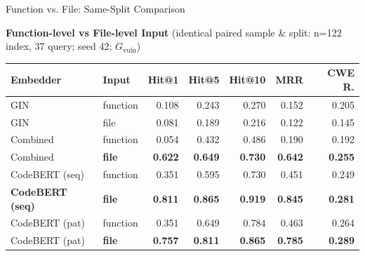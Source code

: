 \documentclass[aspectratio=169,10pt]{beamer}
\begin{document}


\begin{frame}{Function vs. File: Same-Split Comparison}

  \begin{center}
    {\small\textbf{Function-level vs File-level Input} {\scriptsize(identical paired sample \& split: n=122 index, 37 query; seed 42; $G_{\mathrm{vuln}}$)}}\\[4pt]
  {\scriptsize
  \renewcommand{\arraystretch}{1.15}
  \setlength{\tabcolsep}{4pt}
    \begin{tabular}{llrrrrr}
      \toprule
      \textbf{Embedder} & \textbf{Input} & \textbf{Hit@1} & \textbf{Hit@5} & \textbf{Hit@10} & \textbf{MRR} & \textbf{CWE R.} \\
      \midrule
      GIN & function & 0.108 & 0.243 & 0.270 & 0.152 & 0.205 \\
      \rowcolor{miss!15}
      GIN & file & 0.081 & 0.189 & 0.216 & 0.122 & 0.145 \\
      \midrule
      Combined & function & 0.054 & 0.432 & 0.486 & 0.190 & 0.192 \\
      \rowcolor{hit!12}
      Combined & \textbf{file} & \textbf{0.622} & \textbf{0.649} & \textbf{0.730} & \textbf{0.642} & \textbf{0.255} \\
      \midrule
      CodeBERT (seq) & function & 0.351 & 0.595 & 0.730 & 0.451 & 0.249 \\
      \rowcolor{hit!12}
      \textbf{CodeBERT (seq)} & \textbf{file} & \textbf{0.811} & \textbf{0.865} & \textbf{0.919} & \textbf{0.845} & \textbf{0.281} \\
      \midrule
      CodeBERT (pat) & function & 0.351 & 0.649 & 0.784 & 0.463 & 0.264 \\
      \rowcolor{hit!12}
      CodeBERT (pat) & \textbf{file} & \textbf{0.757} & \textbf{0.811} & \textbf{0.865} & \textbf{0.785} & \textbf{0.289} \\
      \bottomrule
    \end{tabular}}
  \end{center}


\end{frame}
\end{document}
